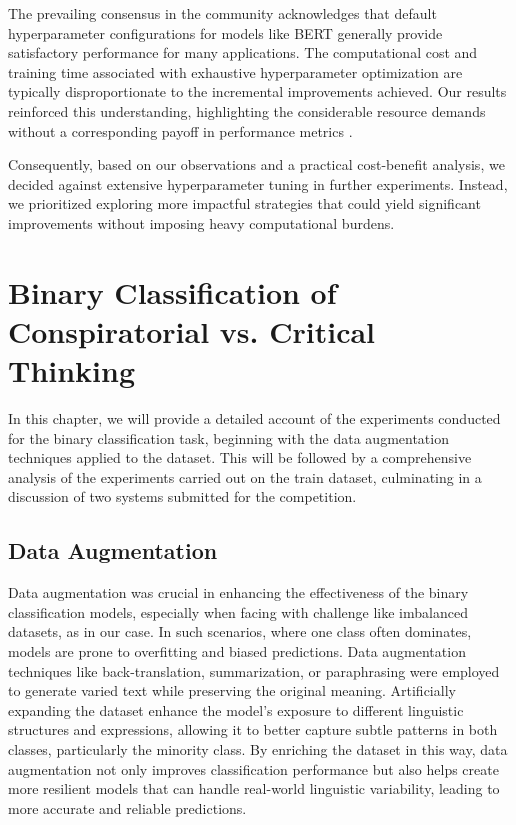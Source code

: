 \documentclass{Configuration_Files/PoliMi3i_thesis}
\begin{document}
The prevailing consensus in the community acknowledges that default hyperparameter configurations for models like BERT generally provide satisfactory performance for many applications. The computational cost and training time associated with exhaustive hyperparameter optimization are typically disproportionate to the incremental improvements achieved. Our results reinforced this understanding, highlighting the considerable resource demands without a corresponding payoff in performance metrics \cite{alibrahim2021hyperparameter}.

Consequently, based on our observations and a practical cost-benefit analysis, we decided against extensive hyperparameter tuning in further experiments. Instead, we prioritized exploring more impactful strategies that could yield significant improvements without imposing heavy computational burdens.


\chapter{Binary Classification of Conspiratorial vs. Critical Thinking} \label{chap:text_classification_task}
In this chapter, we will provide a detailed account of the experiments conducted for the binary classification task, beginning with the data augmentation techniques applied to the dataset. This will be followed by a comprehensive analysis of the experiments carried out on the train dataset, culminating in a discussion of two systems submitted for the competition.

\section{Data Augmentation} \label{sec:data_augmentation_T1}
Data augmentation was crucial in enhancing the effectiveness of the binary classification models, especially when facing with challenge like imbalanced datasets, as in our case. In such scenarios, where one class often dominates, models are prone to overfitting and biased predictions. 
Data augmentation techniques like back-translation, summarization, or paraphrasing were employed to generate varied text while preserving the original meaning. Artificially expanding the dataset enhance the model's exposure to different linguistic structures and expressions, allowing it to better capture subtle patterns in both classes, particularly the minority class. By enriching the dataset in this way, data augmentation not only improves classification performance but also helps create more resilient models that can handle real-world linguistic variability, leading to more accurate and reliable predictions.
\end{document}
